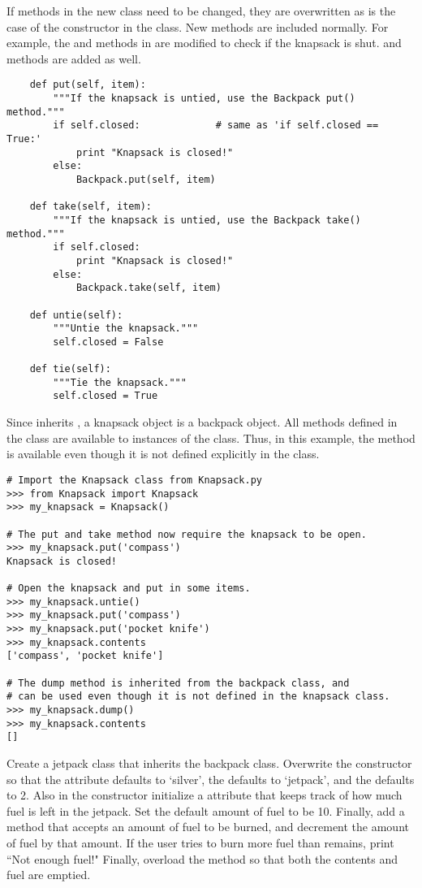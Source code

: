 If methods in the new class need to be changed, they are overwritten as is the case of the constructor in the  class.
New methods are included normally.
For example, the  and  methods in  are modified to check if the knapsack is shut. 
 and  methods are added as well.

\begin{lstlisting}
    def put(self, item):
        """If the knapsack is untied, use the Backpack put() method."""
        if self.closed:				# same as 'if self.closed == True:'
            print "Knapsack is closed!"
        else:
            Backpack.put(self, item)
    
    def take(self, item):
        """If the knapsack is untied, use the Backpack take() method."""
        if self.closed:
            print "Knapsack is closed!"
        else:
            Backpack.take(self, item)
    
    def untie(self):
        """Untie the knapsack."""
        self.closed = False
    
    def tie(self):
        """Tie the knapsack."""
        self.closed = True
\end{lstlisting}

Since  inherits , a knapsack object is a backpack object.
All methods defined in the  class are available to instances of the  class.
Thus, in this example, the  method is available even though it is not defined explicitly in the  class.

\begin{lstlisting}
# Import the Knapsack class from Knapsack.py
>>> from Knapsack import Knapsack
>>> my_knapsack = Knapsack()

# The put and take method now require the knapsack to be open.
>>> my_knapsack.put('compass')
Knapsack is closed!

# Open the knapsack and put in some items.
>>> my_knapsack.untie()
>>> my_knapsack.put('compass')
>>> my_knapsack.put('pocket knife')
>>> my_knapsack.contents
['compass', 'pocket knife']

# The dump method is inherited from the backpack class, and
# can be used even though it is not defined in the knapsack class.
>>> my_knapsack.dump()
>>> my_knapsack.contents
[]
\end{lstlisting}

\begin{problem}

Create a jetpack class that inherits the backpack class.
Overwrite the constructor so that the  attribute defaults to `silver', the  defaults to `jetpack', and the  defaults to 2.
Also in the constructor initialize a  attribute that keeps track of how much fuel is left in the jetpack.
Set the default amount of fuel to be 10.
Finally, add a  method that accepts an amount of fuel to be burned, and decrement the amount of fuel by that amount.
If the user tries to burn more fuel than remains, print ``Not enough fuel!"
Finally, overload the  method so that both the contents and fuel are emptied.
\end{problem}

